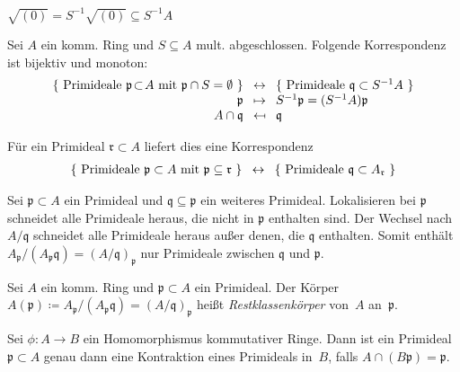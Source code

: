 \documentclass{cheat-sheet}
\newcommand{\ppp}{\mathfrak{p}}
\newcommand{\qqq}{\mathfrak{q}}
\newcommand{\rrr}{\mathfrak{r}}
\begin{document}
\begin{kor}
  $\sqrt{(0)} = S^{-1} \sqrt{(0)} \subseteq S^{-1} A$
\end{kor}


\begin{prop}
  Sei $A$ ein komm. Ring und $S \subseteq A$ mult. abgeschlossen.
  Folgende Korrespondenz ist bijektiv und monoton:
  \[
    \arraycolsep=4pt
    \begin{array}{r c l}
      \{ \text{ Primideale $\ppp \!\subset\! A$ mit $\ppp \cap S = \emptyset$ } \} & \leftrightarrow & \{ \text{ Primideale $\qqq \subset S^{-1} A$ } \} \\
      \ppp & \mapsto & S^{-1} \ppp = (S^{-1} A) \ppp \\
      A \cap \qqq & \mapsfrom & \qqq
    \end{array}
  \]
\end{prop}

\begin{kor}
  Für ein Primideal $\rrr \subset A$ liefert dies eine Korrespondenz
  \[
    \arraycolsep=4pt
    \begin{array}{r c l}
      \{ \text{ Primideale $\ppp \subset A$ mit $\ppp \subseteq \rrr$ } \} & \leftrightarrow & \{ \text{ Primideale $\qqq \subset A_\rrr$ } \}
    \end{array}
  \]
\end{kor}

\begin{bem}
  Sei $\ppp \subset A$ ein Primideal und $\qqq \subseteq \ppp$ ein weiteres Primideal.
  Lokalisieren bei $\ppp$ schneidet alle Primideale heraus, die nicht in $\ppp$ enthalten sind.
  Der Wechsel nach $A/\qqq$ schneidet alle Primideale heraus außer denen, die $\qqq$ enthalten.
  Somit enthält $A_\ppp / (A_\ppp \qqq) = (A/\qqq)_\ppp$ nur Primideale zwischen $\qqq$ und $\ppp$.
\end{bem}

\begin{defn}
  Sei $A$ ein komm. Ring und $\ppp \subset A$ ein Primideal.
  Der Körper $A(\ppp) \coloneqq A_\ppp / (A_\ppp \qqq) = (A/\qqq)_\ppp$ heißt \emph{Restklassenkörper} von~$A$ an~$\ppp$.
\end{defn}

\begin{prop}
  Sei $\phi : A \to B$ ein Homomorphismus kommutativer Ringe.
  Dann ist ein Primideal $\ppp \subset A$ genau dann eine Kontraktion eines Primideals in~$B$, falls $A \cap (B \ppp) = \ppp$.
\end{prop}
\end{document}
